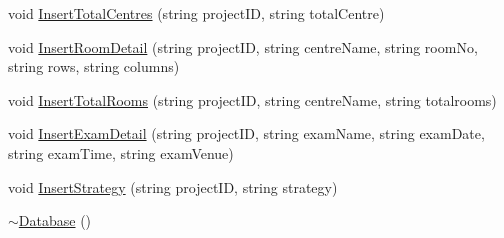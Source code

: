 \begin{DoxyCompactItemize}
\item 
void \hyperlink{classDatabase_a8e52c1b853b6f1d96cf7053f0268838d}{Insert\-Total\-Centres} (string project\-I\-D, string total\-Centre)
\item 
void \hyperlink{classDatabase_a8b248d14e1cb2fc4ba2c9da313f385cb}{Insert\-Room\-Detail} (string project\-I\-D, string centre\-Name, string room\-No, string rows, string columns)
\item 
void \hyperlink{classDatabase_a6cd1b1181fb636aff93ba43f0fcd2764}{Insert\-Total\-Rooms} (string project\-I\-D, string centre\-Name, string totalrooms)
\item 
void \hyperlink{classDatabase_a0a1ec932aafeef96637d5ee68ac7898b}{Insert\-Exam\-Detail} (string project\-I\-D, string exam\-Name, string exam\-Date, string exam\-Time, string exam\-Venue)
\item 
void \hyperlink{classDatabase_a6015ae56eb561f579e573be709ef434c}{Insert\-Strategy} (string project\-I\-D, string strategy)
\item 
\hyperlink{classDatabase_a84d399a2ad58d69daab9b05330e1316d}{$\sim$\-Database} ()
\end{DoxyCompactItemize}

